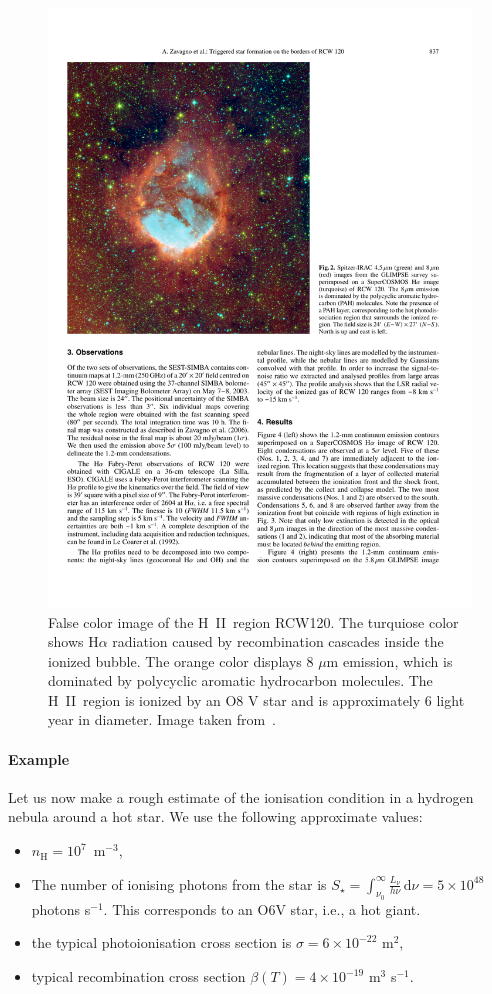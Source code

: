 \documentclass[12pt]{article}
\numberwithin{equation}{section}
\def\dd{\mathrm{d}}
\def\HII{H~II}
\begin{document}
    \begin{figure}
    \centering
   \includegraphics[width=12cm]{figs/RCW120}
    \caption{False color image of the \HII\ region RCW120. The turquiose color shows H$\alpha$ radiation caused by recombination cascades inside the ionized bubble. The orange color displays 8 $\mu$m emission, which is dominated by polycyclic aromatic hydrocarbon molecules. The \HII\ region is ionized by an O8 V star and is approximately 6 light year in diameter. Image taken from~\citet{2007A&A...472..835Z}.}
     \label{fig:RCW120}
    \end{figure}

\paragraph{Example} Let us  now make a rough estimate of the ionisation condition in a hydrogen nebula around a hot star. We use the following approximate values:
\begin{itemize}
\item $n_\mathrm{H} = 10^7$~m$^{-3}$,
\item The number of ionising photons from the star is $S_\star = \int_{\nu_0}^\infty \frac{L_\nu}{h \nu} \, \dd \nu = 5 \times 10^{48}  $ photons s$^{-1}$. This corresponds to an O6V star, i.e., a hot giant.
\item the typical photoionisation cross section is $\sigma = 6 \times 10^{-22}$ m$^{2}$,
\item typical recombination cross section $\beta(T) = 4  \times 10^{-19}$ m$^{3}$ s$^{-1}$.
\end{itemize}
\end{document}
